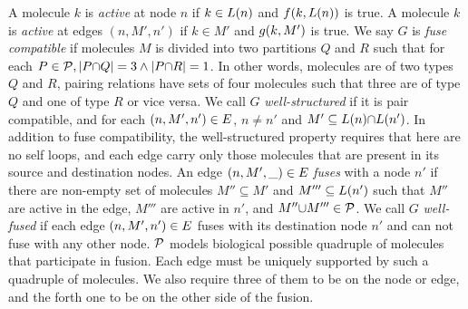 



%
A molecule $k$ is {\em active} at node $n$ if $k \in L(n)$ and
$f(k,L(n))$ is true.
%
A molecule $k$ is {\em active} at edges $(n,M',n')$ if $k \in M'$ and
$g(k,M')$ is true.
%
We say $G$ is {\em fuse compatible} if molecules $M$ is divided into
two partitions $Q$ and $R$ such that
for each $P \in \mathcal{P}, |P {\cap} Q| = 3 \land |P {\cap} R| = 1 $.
%
In other words,
molecules are of two types $Q$ and $R$,
%
pairing relations have sets of four molecules such that three
are of type $Q$ and one of type $R$ or vice versa.
%
%
We call $G$ {\em well-structured} if it is pair compatible, and
for each $(n,M',n') \in E$, $n \neq n'$ and
$M' \subseteq L(n) {\cap} L(n')$.
%
In addition to fuse compatibility, the well-structured property requires that
here are no self loops, and 
each edge carry only those molecules that are present in its source
and destination nodes.
%
An edge $(n,M',\_) \in E$ {\em fuses} with a node $n'$
if there are non-empty set of molecules $M'' \subseteq M'$ and $M''' \subseteq L(n')$
such that $M''$ are active in the edge, $M'''$ are active in $n'$, and $M'' {\cup} M''' \in \mathcal{P}$.
%
We call $G$ {\em well-fused} if each edge $(n,M',n') \in E$ fuses
with its destination node $n'$
and can not fuse with any other node.
%
$\mathcal{P}$ models biological possible quadruple of molecules that participate in fusion.
%
Each edge must be uniquely supported by such a quadruple of molecules.
%
We also require three of them to be on the node or edge, and the forth one
to be on the other side of the fusion.

